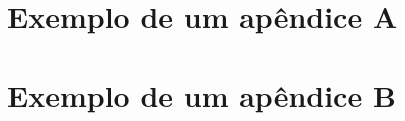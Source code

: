 \documentclass[
12pt,				%
openright,			%
oneside,
a4paper,			%
english,			%
french,				%
spanish,			%
brazil,				%
]{abntex2}
\begin{document}
	
	
	
	
	
	\postextual
	
	
	
	
	
	\begin{apendicesenv}
		
		\partapendices
		
		\chapter{Exemplo de um apêndice A}
		
		
		
		\chapter{Exemplo de um apêndice B}
		
		
	\end{apendicesenv}
	
	
	
\end{document}
